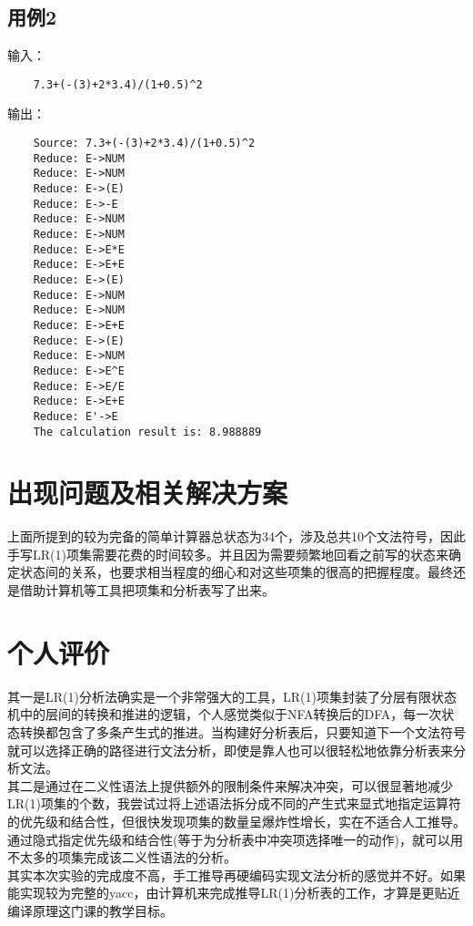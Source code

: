 \documentclass[a4paper]{ctexart} %
\begin{document}
	\subsection{用例2}

	输入：
	\begin{verbatim}
	7.3+(-(3)+2*3.4)/(1+0.5)^2
	\end{verbatim}

	输出：
	\begin{verbatim}
	Source: 7.3+(-(3)+2*3.4)/(1+0.5)^2
	Reduce: E->NUM
	Reduce: E->NUM
	Reduce: E->(E)
	Reduce: E->-E
	Reduce: E->NUM
	Reduce: E->NUM
	Reduce: E->E*E
	Reduce: E->E+E
	Reduce: E->(E)
	Reduce: E->NUM
	Reduce: E->NUM
	Reduce: E->E+E
	Reduce: E->(E)
	Reduce: E->NUM
	Reduce: E->E^E
	Reduce: E->E/E
	Reduce: E->E+E
	Reduce: E'->E
	The calculation result is: 8.988889	
	\end{verbatim}

	\section{出现问题及相关解决方案}
	上面所提到的较为完备的简单计算器总状态为34个，涉及总共10个文法符号，因此手写LR(1)项集需要花费的时间较多。并且因为需要频繁地回看之前写的状态来确定状态间的关系，也要求相当程度的细心和对这些项集的很高的把握程度。最终还是借助计算机等工具把项集和分析表写了出来。

	\section{个人评价}
	其一是LR(1)分析法确实是一个非常强大的工具，LR(1)项集封装了分层有限状态机中的层间的转换和推进的逻辑，个人感觉类似于NFA转换后的DFA，每一次状态转换都包含了多条产生式的推进。当构建好分析表后，只要知道下一个文法符号就可以选择正确的路径进行文法分析，即使是靠人也可以很轻松地依靠分析表来分析文法。\\
	其二是通过在二义性语法上提供额外的限制条件来解决冲突，可以很显著地减少LR(1)项集的个数，我尝试过将上述语法拆分成不同的产生式来显式地指定运算符的优先级和结合性，但很快发现项集的数量呈爆炸性增长，实在不适合人工推导。通过隐式指定优先级和结合性(等于为分析表中冲突项选择唯一的动作)，就可以用不太多的项集完成该二义性语法的分析。\\
	其实本次实验的完成度不高，手工推导再硬编码实现文法分析的感觉并不好。如果能实现较为完整的yacc，由计算机来完成推导LR(1)分析表的工作，才算是更贴近编译原理这门课的教学目标。
	
\end{document}
